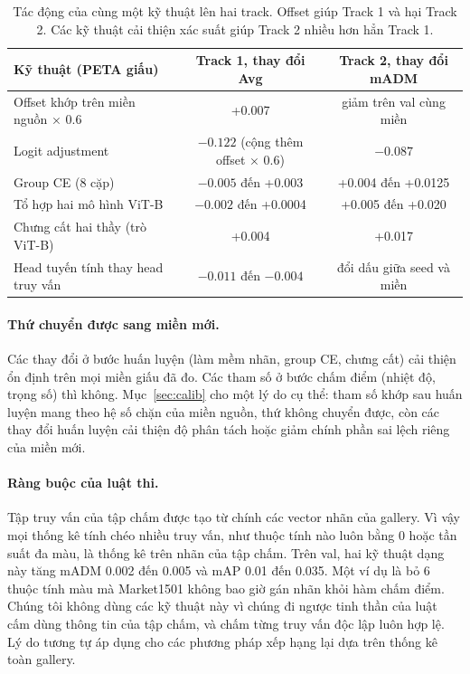 \documentclass[11pt,a4paper]{article}
\begin{document}
\begin{table}[H]
\centering\small
\begin{tabularx}{\linewidth}{@{}Xcc@{}}
\toprule
Kỹ thuật (PETA giấu) & Track 1, thay đổi Avg & Track 2, thay đổi mADM \\
\midrule
Offset khớp trên miền nguồn × 0.6 & +0.007 & giảm trên val cùng miền \\
Logit adjustment & $-0.122$ (cộng thêm offset × 0.6) & $-0.087$ \\
Group CE (8 cặp) & $-0.005$ đến +0.003 & +0.004 đến +0.0125 \\
Tổ hợp hai mô hình ViT-B & $-0.002$ đến +0.0004 & +0.005 đến +0.020 \\
Chưng cất hai thầy (trò ViT-B) & +0.004 & +0.017 \\
Head tuyến tính thay head truy vấn & $-0.011$ đến $-0.004$ & đổi dấu giữa seed và miền \\
\bottomrule
\end{tabularx}
\caption{Tác động của cùng một kỹ thuật lên hai track. Offset giúp Track 1 và hại Track 2. Các kỹ thuật cải thiện xác suất giúp Track 2 nhiều hơn hẳn Track 1.}
\label{tab:t1t2}
\end{table}

\paragraph{Thứ chuyển được sang miền mới.} Các thay đổi ở bước huấn luyện (làm mềm nhãn, group CE, chưng cất) cải thiện ổn định trên mọi miền giấu đã đo. Các tham số ở bước chấm điểm (nhiệt độ, trọng số) thì không. Mục~\ref{sec:calib} cho một lý do cụ thể: tham số khớp sau huấn luyện mang theo hệ số chặn của miền nguồn, thứ không chuyển được, còn các thay đổi huấn luyện cải thiện độ phân tách hoặc giảm chính phần sai lệch riêng của miền mới.

\paragraph{Ràng buộc của luật thi.}
\label{sec:rules}
Tập truy vấn của tập chấm được tạo từ chính các vector nhãn của gallery. Vì vậy mọi thống kê tính chéo nhiều truy vấn, như thuộc tính nào luôn bằng 0 hoặc tần suất đa màu, là thống kê trên nhãn của tập chấm. Trên val, hai kỹ thuật dạng này tăng mADM 0.002 đến 0.005 và mAP 0.01 đến 0.035. Một ví dụ là bỏ 6 thuộc tính màu mà Market1501 không bao giờ gán nhãn khỏi hàm chấm điểm. Chúng tôi không dùng các kỹ thuật này vì chúng đi ngược tinh thần của luật cấm dùng thông tin của tập chấm, và chấm từng truy vấn độc lập luôn hợp lệ. Lý do tương tự áp dụng cho các phương pháp xếp hạng lại dựa trên thống kê toàn gallery.
\end{document}

